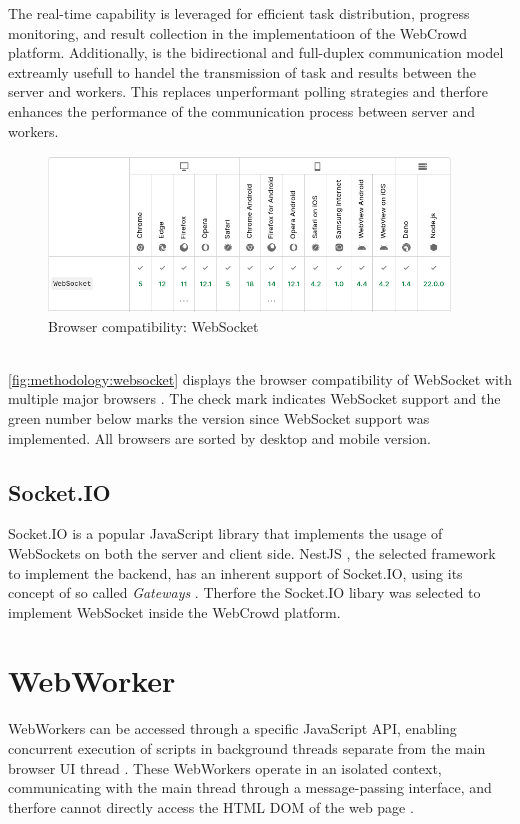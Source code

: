 The real-time capability is leveraged for efficient task distribution, progress monitoring, and result collection in the implementatioon of the WebCrowd platform. Additionally, is the bidirectional and full-duplex communication model extreamly usefull to handel the transmission of task and results between the server and workers. This replaces unperformant polling strategies and therfore enhances the performance of the communication process between server and workers.
\begin{figure}[htbp]
  \centering
  \includegraphics[width=0.95\textwidth]{gfx/figures/websocket-browsercompability.png}
  \caption{Browser compatibility: WebSocket \cite{methodology:websockets1}}
  \label{fig:methodology:websocket}
\end{figure}
~\\
\autoref{fig:methodology:websocket} displays the browser compatibility of WebSocket with multiple major browsers \cite{methodology:websockets1}. The check mark indicates WebSocket support and the green number below marks the version since WebSocket support was implemented. All browsers are sorted by desktop and mobile version. 

\subsection{Socket.IO}
Socket.IO \cite{methodology:websockets2} is a popular JavaScript library that implements the usage of WebSockets on both the server and client side. NestJS \cite{methodology:nestjs}, the selected framework to implement the backend, has an inherent support of Socket.IO, using its concept of so called \emph{Gateways} \cite{methodology:nestjs}. Therfore the Socket.IO libary was selected to implement WebSocket inside the WebCrowd platform.

\section{WebWorker}
\label{sec:methodology:webworker}
WebWorkers can be accessed through a specific JavaScript \ac{API}, enabling concurrent execution of scripts in background threads separate from the main browser UI thread \cite{methodology:webworkers}. These WebWorkers operate in an isolated context, communicating with the main thread through a message-passing interface, and therfore cannot directly access the \acs{HTML} \acs{DOM} of the web page \cite{methodology:webworkers}. 

